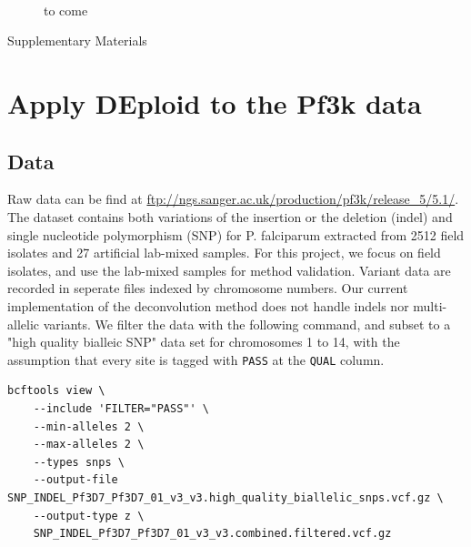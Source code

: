 \documentclass{article}
\begin{document}
\begin{figure}[h]
\centering
{}\\

\caption{to come}

\end{figure}





\newpage

\begin{center}
\LARGE
Supplementary Materials
\end{center}



\section{Apply DEploid to the Pf3k data}
\subsection{Data}
Raw data can be find at \url{ftp://ngs.sanger.ac.uk/production/pf3k/release_5/5.1/}. The dataset contains both variations of the insertion or the deletion (indel) and single nucleotide polymorphism (SNP) for {P. falciparum} extracted from 2512 field isolates and 27 artificial lab-mixed samples. For this project, we focus on field isolates, and use the lab-mixed samples for method validation. Variant data are recorded in seperate files indexed by chromosome numbers. Our current implementation of the deconvolution method \citep{Zhu2017} does not handle indels nor multi-allelic variants. We filter the data with the following command, and subset to a "high quality bialleic SNP" data set for chromosomes 1 to 14, with the assumption that every site is tagged with {\tt PASS} at the {\tt QUAL} column.
\linespread{1}
\begin{lstlisting}
bcftools view \
    --include 'FILTER="PASS"' \
    --min-alleles 2 \
    --max-alleles 2 \
    --types snps \
    --output-file SNP_INDEL_Pf3D7_Pf3D7_01_v3_v3.high_quality_biallelic_snps.vcf.gz \
    --output-type z \
    SNP_INDEL_Pf3D7_Pf3D7_01_v3_v3.combined.filtered.vcf.gz
\end{lstlisting}
\linespread{1.5}
\end{document}
